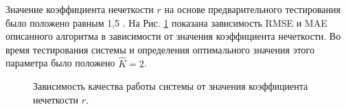 \documentclass[a4paper, 12pt]{article} %
\begin{document}
	Значение коэффициента нечеткости $r$ на основе предварительного тестирования было положено равным 1,5 . На Рис. \ref{fig:fuzz} показана зависимость RMSE и MAE описанного алгоритма в зависимости от значения коэффициента нечеткости. Во время тестирования системы и определения оптимального значения этого параметра было положено $\hat{K}=2$. 
	\begin{figure}[h!]
	\begin{minipage}[h]{0.49\linewidth}
	\end{minipage}
	\hfill
	\begin{minipage}[h]{0.49\linewidth}
	\end{minipage}
	\caption{Зависимость качества работы системы от значения коэффициента нечеткости $r$.}
	\label{fig:fuzz}
	\end{figure}
\end{document}
